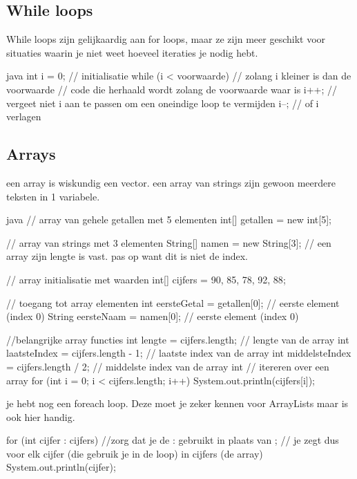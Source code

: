 \documentclass[a4paper,11pt]{article}
\begin{document}
\subsection{While loops}
While loops zijn gelijkaardig aan for loops, maar ze zijn
meer geschikt voor situaties waarin je niet weet hoeveel iteraties je nodig hebt.
\begin{codeblock}{java}
    int i = 0; // initialisatie
    while (i < voorwaarde) // zolang i kleiner is dan de voorwaarde
     {
        // code die herhaald wordt zolang de voorwaarde waar is
        i++; // vergeet niet i aan te passen om een oneindige loop te vermijden
        i--; // of i verlagen
    }
\end{codeblock}


\subsection{Arrays}

een array is wiskundig een vector.
een array van strings zijn gewoon meerdere teksten in 1 variabele.
\begin{codeblock}[array]{java}
    // array van gehele getallen met 5 elementen
    int[] getallen = new int[5];

    // array van strings met 3 elementen
    String[] namen = new String[3]; // een array zijn lengte is vast. pas op want dit is niet de index.

    // array initialisatie met waarden
    int[] cijfers = {90, 85, 78, 92, 88};

    // toegang tot array elementen
    int eersteGetal = getallen[0]; // eerste element (index 0) 
    String eersteNaam = namen[0]; // eerste element (index 0)

    //belangrijke array functies
    int lengte = cijfers.length; // lengte van de array
    int laatsteIndex = cijfers.length - 1; // laatste index van de array
    int middelsteIndex = cijfers.length / 2; // middelste index van de array
    int 
    // itereren over een array
    for (int i = 0; i < cijfers.length; i++) 
    {
        System.out.println(cijfers[i]);
    }

    je hebt nog een foreach loop. Deze moet je zeker kennen voor ArrayLists maar
    is ook hier handig.

    for (int cijfer : cijfers) //zorg dat je de : gebruikt in plaats van ;
    // je zegt dus voor elk cijfer (die gebruik je in de loop) in cijfers (de array)
    {
        System.out.println(cijfer);
    }
\end{codeblock}
\end{document}
